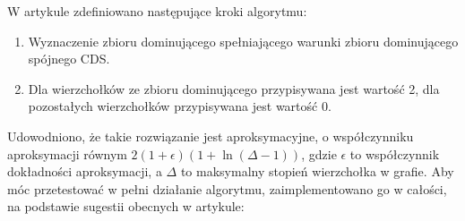  W artykule zdefiniowano następujące kroki algorytmu:
\begin{enumerate}
    \item Wyznaczenie zbioru dominującego spełniającego warunki zbioru dominującego spójnego CDS.
    \item Dla wierzchołków ze zbioru dominującego przypisywana jest wartość 2, dla pozostałych wierzchołków przypisywana jest wartość 0.
\end{enumerate}

Udowodniono, że takie rozwiązanie jest aproksymacyjne, o współczynniku aproksymacji równym
$2(1+\epsilon)(1 + \ln(\Delta - 1))$, gdzie $\epsilon$ to współczynnik dokładności aproksymacji, a $\Delta$ to maksymalny stopień wierzchołka w grafie. Aby móc przetestować w pełni działanie algorytmu, zaimplementowano go w całości, na podstawie sugestii obecnych w artykule:

